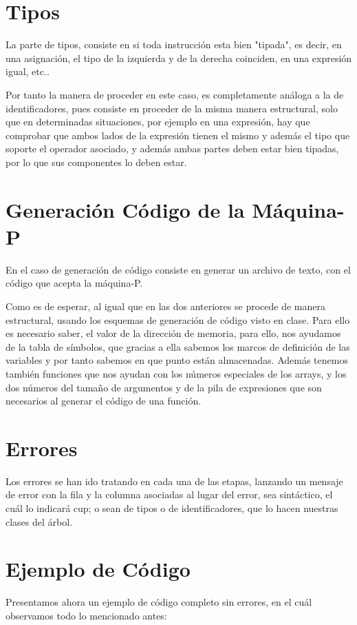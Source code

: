 \documentclass[a4paper, 11pt, twoside, openany, onecolumn, final]{memoir}
\begin{document}
	 \section{Tipos}
	 La parte de tipos, consiste en si toda instrucción esta bien "tipada", es decir, en una asignación, el tipo de la izquierda y de la derecha coinciden, en una expresión igual, etc..
	 
	 Por tanto la manera de proceder en este caso, es completamente análoga a la de identificadores, pues consiste en proceder de la misma manera estructural, solo que en determinadas situaciones, por ejemplo en una expresión, hay que comprobar que ambos lados de la expresión tienen el mismo y además el tipo que soporte el operador asociado, y además ambas partes deben estar bien tipadas, por lo que sus componentes lo deben estar. 
	 \section{Generación Código de la Máquina-P}
	 En el caso de generación de código consiste en generar un archivo de texto, con el código que acepta la máquina-P.
	 
	 Como es de esperar, al igual que en las dos anteriores se procede de manera estructural, usando los esquemas de generación de código visto en clase. Para ello es necesario saber, el valor de la dirección de memoria, para ello, nos ayudamos de la tabla de símbolos, que gracias a ella sabemos los marcos de definición de las variables y por tanto sabemos en que punto están almacenadas. Además tenemos también funciones que nos ayudan con los números especiales de los arrays, y los dos números del tamaño de argumentos y de la pila de expresiones que son necesarios al generar el código de una función. 
	 \section{Errores}
	 	Los errores se han ido tratando en cada una de las etapas, lanzando un mensaje de error con la fila y la columna asociadas al lugar del error, sea sintáctico, el cuál lo indicará cup; o sean de tipos o de identificadores, que lo hacen nuestras clases del árbol. 
	 \section{Ejemplo de Código}
	 Presentamos ahora un ejemplo de código completo sin errores, en el cuál observamos todo lo mencionado antes:
	 
	 
\end{document}
